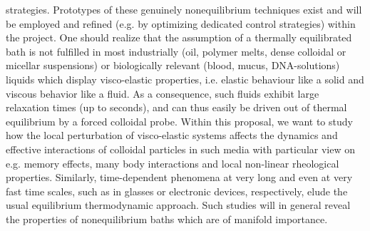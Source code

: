 strategies. Prototypes of these genuinely nonequilibrium techniques exist and will be
employed and refined (e.g. by optimizing dedicated control strategies) within the project.
One should realize that the assumption of a thermally equilibrated bath is not fulfilled in
most industrially (oil, polymer melts, dense colloidal or micellar suspensions) or
biologically relevant (blood, mucus, DNA-solutions) liquids which display visco-elastic
properties, i.e. elastic behaviour like a solid and viscous behavior like a fluid. As a
consequence, such fluids exhibit large relaxation times (up to seconds), and can thus easily
be driven out of thermal equilibrium by a forced colloidal probe. Within this proposal, we
want to study how the local perturbation of visco-elastic systems affects the dynamics and
effective interactions of colloidal particles in such media with particular view on
e.g. memory effects, many body interactions and local non-linear rheological properties.
Similarly, time-dependent phenomena at very long and even at very fast time scales, such as
in glasses or electronic devices, respectively, elude the usual equilibrium thermodynamic
approach.  Such studies will in general reveal the properties of nonequilibrium baths which
are of manifold importance.


